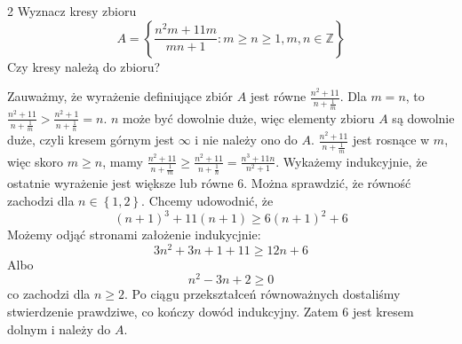 \documentclass{../note}
\begin{document}
\begin{zadanie}{2}
Wyznacz kresy zbioru
\[ A = \left\{\frac{n^{2}m+11m}{mn+1} : m \ge n \ge 1, m,n \in \mathbb{Z}\right\} \]
Czy kresy należą do zbioru?
\end{zadanie}
\begin{rozwiazanie}
Zauważmy, że wyrażenie definiujące zbiór $A$ jest równe $\frac{n^{2}+11}{n+\frac1m}$. Dla $m = n$, to $\frac{n^{2}+11}{n+\frac1m} > \frac{n^{2}+1}{n+\frac1n} = n$. $n$ może być dowolnie duże, więc elementy zbioru $A$ są dowolnie duże, czyli kresem górnym jest $\infty$ i nie należy ono do $A$. $\frac{n^{2}+11}{n+\frac1m}$ jest rosnące w $m$, więc skoro $m \geq n$, mamy $\frac{n^{2}+11}{n+\frac1m} \geq \frac{n^{2}+11}{n+\frac1n} = \frac{n^{3}+11n}{n^2+1}$. Wykażemy indukcyjnie, że ostatnie wyrażenie jest większe lub równe $6$. Można sprawdzić, że równość zachodzi dla $n\in\left\{1, 2\right\}$. Chcemy udowodnić, że 
\[(n+1)^{3}+11(n+1) \geq 6(n+1)^2 + 6\]
Możemy odjąć stronami założenie indukycjnie:
\[3n^2+3n+1+11 \geq 12n+6\]
Albo
\[n^2-3n+2\geq0\]
co zachodzi dla $n \geq 2$. Po ciągu przekształceń równoważnych dostaliśmy stwierdzenie prawdziwe, co kończy dowód indukcyjny. Zatem 6 jest kresem dolnym i należy do $A$.
\end{rozwiazanie}
\end{document}
